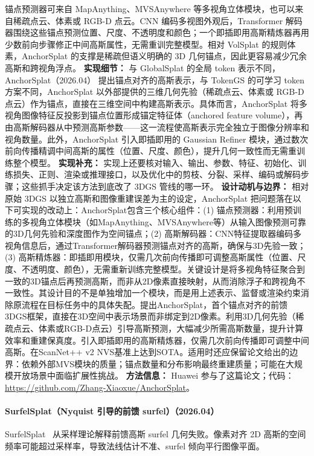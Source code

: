 锚点预测器可来自 MapAnything、MVSAnywhere 等多视角立体模块，也可以来自稀疏点云、体素或 RGB-D 点云。CNN 编码多视图外观后，Transformer 解码器围绕这些锚点预测位置、尺度、不透明度和颜色；一个即插即用高斯精炼器再用少数前向步骤修正中间高斯属性，无需重训完整模型。相对 VolSplat 的规则体素，AnchorSplat 的支撑是稀疏但语义明确的 3D 几何锚点，因此更容易减少冗余高斯和跨视角浮点。
\textbf{实现细节：} 与 GlobalSplat 的全局 token 表示不同，AnchorSplat（2026.04） 提出锚点对齐的高斯表示，与 TokenGS 的可学习 token 方案不同，AnchorSplat 以外部提供的三维几何先验（稀疏点云、体素或 RGB-D 点云）作为锚点，直接在三维空间中构建高斯表示。具体而言，AnchorSplat 将多视角图像特征反投影到锚点位置形成锚定特征体（anchored feature volume），再由高斯解码器从中预测高斯参数——这一流程使高斯表示完全独立于图像分辨率和视角数量。此外，AnchorSplat 引入即插即用的 Gaussian Refiner 模块，通过数次前向传播精调中间高斯的属性（位置、尺度、颜色），提升几何一致性而无需重训练整个模型。
\textbf{实现补充：} 实现上还要核对输入、输出、参数、特征、初始化、训练损失、正则、渲染或推理接口，以及优化中的剪枝、分裂、采样、编码或解码步骤；这些抓手决定该方法到底改了 3DGS 管线的哪一环。
\textbf{设计动机与边界：} 相对原始 3DGS 以独立高斯和图像重建误差为主的设定，AnchorSplat 把问题落在以下可实现的改动上：AnchorSplat包含三个核心组件：(1) 锚点预测器：利用预训练的多视角立体模块（如MapAnything、MVSAnywhere等）从输入图像预测可靠的3D几何先验和深度图作为空间锚点；(2) 高斯解码器：CNN特征提取器编码多视角信息后，通过Transformer解码器预测锚点对齐的高斯，确保与3D先验一致；(3) 高斯精炼器：即插即用模块，仅需几次前向传播即可调整高斯属性（位置、尺度、不透明度、颜色），无需重新训练完整模型。关键设计是将多视角特征聚合到一致的3D锚点后再预测高斯，而非从2D像素直接映射，从而消除浮子和跨视角不一致性。其设计目的不是单独增加一个模块，而是用上述表示、监督或渲染约束消除原流程在目标任务中的具体失配。提出AnchorSplat，首个锚点对齐的前馈3DGS框架，直接在3D空间中表示场景而非绑定到2D像素。利用3D几何先验（稀疏点云、体素或RGB-D点云）引导高斯预测，大幅减少所需高斯数量，提升计算效率和重建保真度。引入即插即用的高斯精炼器，仅需几次前向传播即可调整中间高斯。在ScanNet++ v2 NVS基准上达到SOTA。适用时还应保留论文给出的边界：依赖外部MVS模块的质量；锚点数量和分布影响最终重建质量；可能在大规模开放场景中面临扩展性挑战。
\textbf{方法信息：} Huawei 参与了这篇论文；代码：\url{https://github.com/Zhang-Xiaoxue/AnchorSplat}。



\paragraph{SurfelSplat（Nyquist 引导的前馈 surfel）（2026.04）}
SurfelSplat~\cite{2604_08370} 从采样理论解释前馈高斯 surfel 几何失败。像素对齐 2D 高斯的空间频率可能超过采样率，导致法线估计不准、surfel 倾向平行图像平面。

